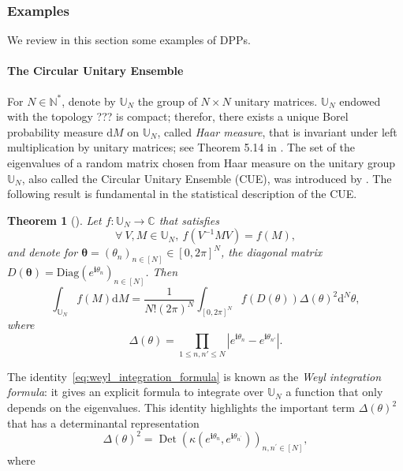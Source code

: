 \documentclass[twoside,11pt]{book}
\newtheorem{theorem}{Theorem}
\numberwithin{theorem}{chapter}
\numberwithin{definition}{chapter}
\numberwithin{proposition}{chapter}
\numberwithin{corollary}{chapter}
\numberwithin{example}{chapter}
\numberwithin{lemma}{chapter}
\DeclareMathOperator{\Det}{Det}
\begin{document}
\subsubsection{Examples}\label{eq:DPP_examples}
We review in this section some examples of DPPs.
\paragraph{The Circular Unitary Ensemble}


For $N \in \mathbb{N}^{*}$, denote by $\mathbb{U}_{N}$ the group of $N \times N$ unitary matrices. $\mathbb{U}_{N}$ endowed with the topology ??? is compact; therefor, there exists a unique Borel probability measure $\mathrm{d}M$ on $\mathbb{U}_{N}$, called \emph{Haar measure}, that is invariant under left multiplication by unitary matrices; see Theorem 5.14 in \citep{Rud91}. The set of the eigenvalues of a random matrix chosen from Haar measure on the unitary group $\mathbb{U}_{N}$, also called the Circular Unitary Ensemble (CUE), was introduced by \cite{Dys62}. The following result is fundamental in the statistical description of the CUE.




\begin{theorem}[\cite{Wey46}]
Let $f: \mathbb{U}_{N} \rightarrow \mathbb{C}$ that satisfies
\begin{equation}\label{eq:weil_condition}
\forall \: V, M \in \mathbb{U}_{N}, \:  f(V^{-1}M V) = f(M),
\end{equation}
and denote for $\bm{\theta} = (\theta_{n})_{n \in [N]} \in [0,2\pi]^{N}$, the diagonal matrix $D(\bm{\theta}) = \mathrm{Diag}(e^{\mathbf{i} \theta_{n}})_{n \in [N]}$.
Then
\begin{equation}\label{eq:weyl_integration_formula}
\int_{\mathbb{U}_{N}}f(M) \mathrm{d}M = \frac{1}{N!(2 \pi)^{N}} \int_{[0,2\pi]^{N}} f(D(\theta)) \Delta(\theta)^{2} \mathrm{d}^{N}\theta,
\end{equation}
where 
\begin{equation}
\Delta(\theta) = \prod\limits_{1 \leq n,n' \leq N} | e^{\mathbf{i} \theta_{n}} -e^{\mathbf{i} \theta_{n'}} |.
\end{equation}
\end{theorem}
The identity~\eqref{eq:weyl_integration_formula} is known as the \emph{Weyl integration formula}: it gives an explicit formula to integrate  over $\mathbb{U}_N$ a function that only depends on the eigenvalues. This identity highlights the important term $\Delta(\theta)^{2}$ that has a determinantal representation
\begin{equation}
\Delta(\theta)^{2} = \Det (\kappa(e^{\mathbf{i}\theta_{n}},e^{\mathbf{i}\theta_{n^{'}}}))_{n,n^{'} \in [N]},
\end{equation}
where
\end{document}
